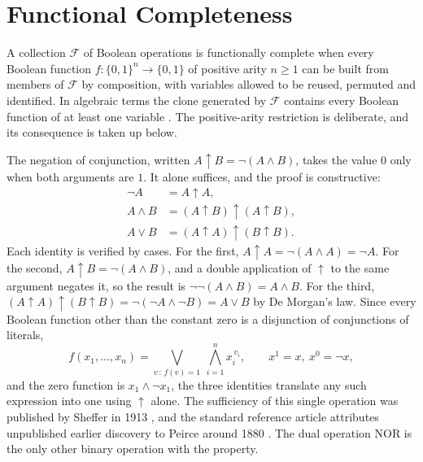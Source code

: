 \documentclass[11pt]{article}
\theoremstyle{definition}
\theoremstyle{remark}
\newcommand{\nand}{\uparrow}
\begin{document}
\section{Functional Completeness}\label{sec:fc}

A collection $\mathcal{F}$ of Boolean operations is functionally complete when every Boolean function $f : \{0,1\}^{n} \to \{0,1\}$ of positive arity $n \ge 1$ can be built from members of $\mathcal{F}$ by composition, with variables allowed to be reused, permuted and identified. In algebraic terms the clone generated by $\mathcal{F}$ contains every Boolean function of at least one variable \cite{wikifc}. The positive-arity restriction is deliberate, and its consequence is taken up below.

The negation of conjunction, written $A \nand B = \neg(A \land B)$, takes the value $0$ only when both arguments are $1$. It alone suffices, and the proof is constructive:
\begin{align*}
\neg A &= A \nand A, \\
A \land B &= (A \nand B) \nand (A \nand B), \\
A \lor B &= (A \nand A) \nand (B \nand B).
\end{align*}
Each identity is verified by cases. For the first, $A \nand A = \neg(A \land A) = \neg A$. For the second, $A \nand B = \neg(A \land B)$, and a double application of $\nand$ to the same argument negates it, so the result is $\neg\neg(A\land B) = A \land B$. For the third, $(A \nand A) \nand (B \nand B) = \neg(\neg A \land \neg B) = A \lor B$ by De Morgan's law. Since every Boolean function other than the constant zero is a disjunction of conjunctions of literals,
\[
f(x_1, \dots, x_n) = \bigvee_{v \,:\, f(v) = 1}\ \bigwedge_{i=1}^{n} x_i^{\,v_i},
\qquad x^{1} = x,\ x^{0} = \neg x,
\]
and the zero function is $x_1 \land \neg x_1$, the three identities translate any such expression into one using $\nand$ alone. The sufficiency of this single operation was published by Sheffer in 1913 \cite{sheffer1913}, and the standard reference article attributes unpublished earlier discovery to Peirce around 1880 \cite{wikifc}. The dual operation NOR is the only other binary operation with the property.
\end{document}
